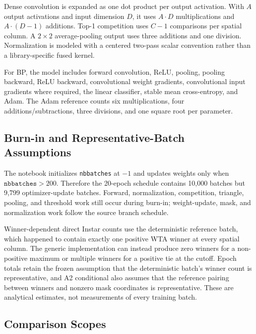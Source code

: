 \documentclass{article}
\begin{document}
    Dense convolution is expanded as one dot product per output activation. With $A$ output activations and input dimension $D$, it uses $A\cdot D$ multiplications and $A\cdot (D-1)$ additions. Top-1 competition uses $C-1$ comparisons per spatial column. A $2\times 2$ average-pooling output uses three additions and one division. Normalization is modeled with a centered two-pass scalar convention rather than a library-specific fused kernel.
    
    For BP, the model includes forward convolution, ReLU, pooling, pooling backward, ReLU backward, convolutional weight gradients, convolutional input gradients where required, the linear classifier, stable mean cross-entropy, and Adam. The Adam reference counts six multiplications, four additions/subtractions, three divisions, and one square root per parameter.
    
    \subsection{Burn-in and Representative-Batch Assumptions}
    
    The notebook initializes \texttt{nbbatches} at $-1$ and updates weights only when $\texttt{nbbatches} > 200$. Therefore the 20-epoch schedule contains 10,000 batches but 9,799 optimizer-update batches. Forward, normalization, competition, triangle, pooling, and threshold work still occur during burn-in; weight-update, mask, and normalization work follow the source branch schedule.
    
    Winner-dependent direct Instar counts use the deterministic reference batch, which happened to contain exactly one positive WTA winner at every spatial column. The generic implementation can instead produce zero winners for a non-positive maximum or multiple winners for a positive tie at the cutoff. Epoch totals retain the frozen assumption that the deterministic batch's winner count is representative, and A2 conditional also assumes that the reference pairing between winners and nonzero mask coordinates is representative. These are analytical estimates, not measurements of every training batch.
    
    \subsection{Comparison Scopes}
    
\end{document}
